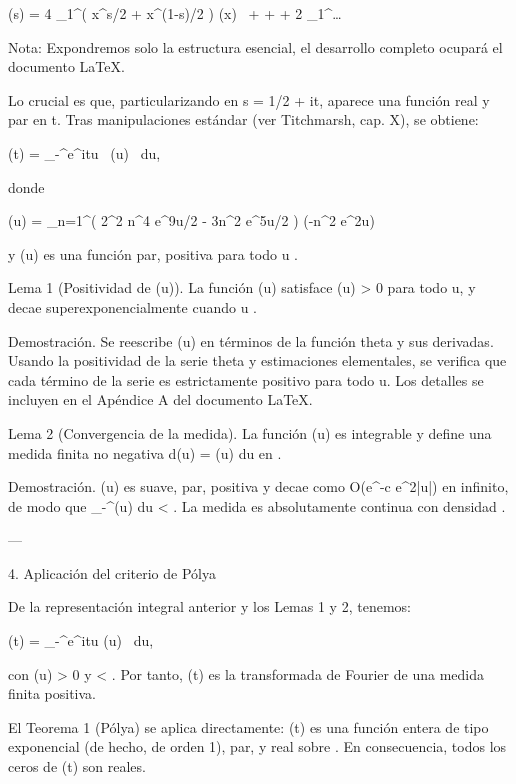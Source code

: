 \documentclass[12pt,twoside]{book}
\begin{document}
\xi(s) = 4 \int_1^\infty \left( x^{s/2} + x^{(1-s)/2} \right) \psi(x) \,  +  +  + 2 \int_1^\infty \dots

Nota: Expondremos solo la estructura esencial, el desarrollo completo ocupará el documento LaTeX.

Lo crucial es que, particularizando en s = 1/2 + it, aparece una función real y par en t. Tras manipulaciones estándar (ver Titchmarsh, cap. X), se obtiene:

\Xi(t) =  \int_{-\infty}^\infty e^{itu} \, \Phi(u) \, du,
\]  

donde

\Phi(u) = \sum_{n=1}^\infty \left( 2\pi^2 n^4 e^{9u/2} - 3\pi n^2 e^{5u/2} \right) \exp(-\pi n^2 e^{2u})
\]  

y \Phi(u) es una función par, positiva para todo u \in {}.

Lema 1 (Positividad de \Phi(u)). La función \Phi(u) satisface \Phi(u) > 0 para todo u, y decae superexponencialmente cuando u \to \pm\infty.

Demostración. Se reescribe \Phi(u) en términos de la función theta y sus derivadas. Usando la positividad de la serie theta y estimaciones elementales, se verifica que cada término de la serie es estrictamente positivo para todo u. Los detalles se incluyen en el Apéndice A del documento LaTeX.

Lema 2 (Convergencia de la medida). La función \Phi(u) es integrable y define una medida finita no negativa d\nu(u) = \Phi(u) du en .

Demostración. \Phi(u) es suave, par, positiva y decae como O(e^{-c e^{2|u|}}) en infinito, de modo que \int_{-\infty}^\infty \Phi(u) du < \infty. La medida \nu es absolutamente continua con densidad \Phi.

---

4. Aplicación del criterio de Pólya

De la representación integral anterior y los Lemas 1 y 2, tenemos:

\Xi(t) =  \int_{-\infty}^\infty e^{itu} \Phi(u) \, du,
\]  

con \Phi(u) > 0 y \int \Phi < \infty. Por tanto, \Xi(t) es la transformada de Fourier de una medida finita positiva.

El Teorema 1 (Pólya) se aplica directamente: \Xi(t) es una función entera de tipo exponencial (de hecho, de orden 1), par, y real sobre . En consecuencia, todos los ceros de \Xi(t) son reales.
\end{document}
